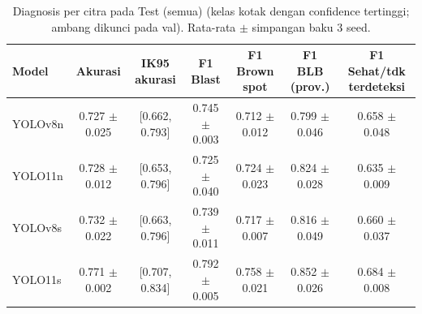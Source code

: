 \begin{table}[!t]
\centering
\caption{Diagnosis per citra pada Test (semua) (kelas kotak dengan confidence tertinggi; ambang dikunci pada val). Rata-rata $\pm$ simpangan baku 3 seed.}
\label{tab:diagnosis_test_dengan_background}
\footnotesize
\begin{tabular}{lcccccc}
\hline
\textbf{Model} & \textbf{Akurasi} & \textbf{IK95 akurasi} & \textbf{F1 Blast} & \textbf{F1 Brown spot} & \textbf{F1 BLB (prov.)} & \textbf{F1 Sehat/tdk terdeteksi} \\
\hline
YOLOv8n & 0.727 $\pm$ 0.025 & [0.662, 0.793] & 0.745 $\pm$ 0.003 & 0.712 $\pm$ 0.012 & 0.799 $\pm$ 0.046 & 0.658 $\pm$ 0.048 \\
YOLO11n & 0.728 $\pm$ 0.012 & [0.653, 0.796] & 0.725 $\pm$ 0.040 & 0.724 $\pm$ 0.023 & 0.824 $\pm$ 0.028 & 0.635 $\pm$ 0.009 \\
YOLOv8s & 0.732 $\pm$ 0.022 & [0.663, 0.796] & 0.739 $\pm$ 0.011 & 0.717 $\pm$ 0.007 & 0.816 $\pm$ 0.049 & 0.660 $\pm$ 0.037 \\
YOLO11s & 0.771 $\pm$ 0.002 & [0.707, 0.834] & 0.792 $\pm$ 0.005 & 0.758 $\pm$ 0.021 & 0.852 $\pm$ 0.026 & 0.684 $\pm$ 0.008 \\
\hline
\end{tabular}
\end{table}
